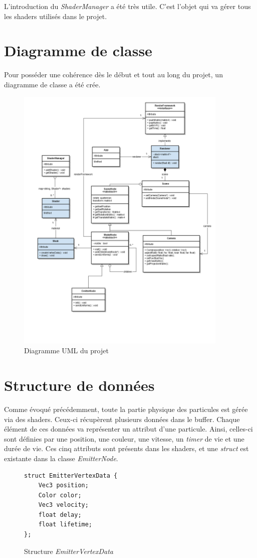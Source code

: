 L'introduction du \emph{ShaderManager} a été très utile. C'est l'objet qui va gérer tous les
shaders utilisés dans le projet.

\section{Diagramme de classe}

Pour posséder une cohérence dès le début et tout au long du projet, un diagramme
de classe a été crée.

\begin{figure}[h]
	\begin{center}
		\includegraphics[width=0.9\textwidth]{img/UML.png}
	\end{center}
	\caption{Diagramme UML du projet}
\end{figure}

\newpage

\section{Structure de données}

Comme évoqué précédemment, toute la partie physique des particules est gérée via
des shaders. Ceux-ci récupèrent plusieurs données dans le buffer. Chaque
élément de ces données va représenter un attribut d'une particule. Ainsi,
celles-ci sont définies par une position, une couleur, une vitesse, un
\emph{timer} de vie et une durée de vie. Ces cinq attributs sont présents dans
les shaders, et une \emph{struct} est existante dans la classe
\emph{EmitterNode}.

\begin{figure}[h]
	\begin{verbatim}
struct EmitterVertexData {
    Vec3 position;
    Color color;
    Vec3 velocity;
    float delay;
    float lifetime;
};
	\end{verbatim}
	\caption{Structure \emph{EmitterVertexData}}
\end{figure}

